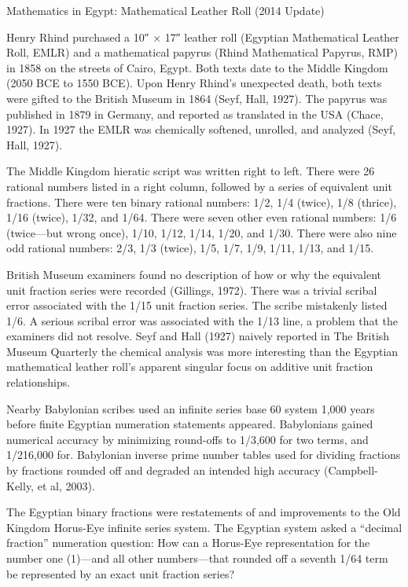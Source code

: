 \documentclass[12pt]{article}
\begin{document}
      Mathematics in Egypt: Mathematical Leather Roll (2014 Update)

Henry Rhind purchased a 10″ × 17″ leather roll (Egyptian Mathematical Leather Roll, EMLR) and a mathematical papyrus (Rhind Mathematical Papyrus, RMP) in 1858 on the streets of Cairo, Egypt. Both texts date to the Middle Kingdom (2050 BCE to 1550 BCE). Upon Henry Rhind’s unexpected death, both texts were gifted to the British Museum in 1864 (Seyf, Hall, 1927). The papyrus was published in 1879 in Germany, and reported as translated in the USA (Chace, 1927). In 1927 the EMLR was chemically softened, unrolled, and analyzed (Seyf,  Hall, 1927). 

The Middle Kingdom hieratic script was written right to left. There were 26 rational numbers listed in a right column, followed by a series of equivalent unit fractions. There were ten binary rational numbers: 1/2, 1/4 (twice), 1/8 (thrice), 1/16 (twice), 1/32, and 1/64. There were seven other even rational numbers: 1/6 (twice—but wrong once), 1/10, 1/12, 1/14, 1/20, and 1/30. There were also nine odd rational numbers: 2/3, 1/3 (twice), 1/5, 1/7, 1/9, 1/11, 1/13, and 1/15.

British Museum examiners found no description of how or why the equivalent unit fraction series were recorded (Gillings, 1972). There was a trivial scribal error associated with the 1/15 unit fraction series. The scribe mistakenly listed 1/6. A serious scribal error was associated with the 1/13 line, a problem that the examiners did not resolve. Seyf and Hall (1927) naively reported in The British Museum Quarterly the chemical analysis was more interesting than the Egyptian mathematical leather roll's apparent singular focus on additive unit fraction relationships.

Nearby Babylonian scribes used an infinite series base 60 system 1,000 years before finite Egyptian numeration statements appeared. Babylonians gained numerical accuracy by minimizing round-offs to 1/3,600 for two terms, and 1/216,000 for.  Babylonian inverse prime number tables used for dividing fractions by fractions rounded off and degraded an intended high accuracy (Campbell-Kelly, et al, 2003). 

The Egyptian binary fractions were restatements of and improvements to the Old Kingdom Horus-Eye infinite series system. The Egyptian system asked a “decimal fraction” numeration question: How can a Horus-Eye  representation for the number one (1)—and all other numbers—that rounded off a seventh 1/64 term be represented by an exact unit fraction series?
\end{document}
